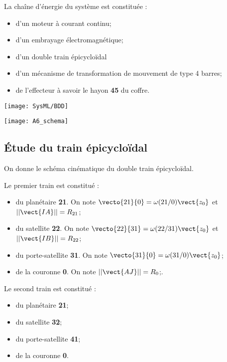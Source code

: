 \begin{multicols}{2}


La chaîne d'énergie du système est constituée :
\begin{itemize}
\item d'un moteur à courant continu;
\item d'un embrayage électromagnétique;
\item d'un double train épicycloïdal
\item d'un mécanisme de transformation de mouvement de type 4 barres;
\item de l'effecteur à savoir le hayon \textbf{45} du coffre.
\end{itemize}

\begin{center}
\texttt{[image: SysML/BDD]}
\end{center}


\begin{center}
\texttt{[image: A6\_schema]}
\end{center}

\fi

\subsection*{Étude du train épicycloïdal}
\ifprof
\else

On donne le schéma cinématique du double train épicycloïdal. 


Le premier train est constitué :
\begin{itemize}
\item du planétaire \textbf{21}. On note $\vecto{21}{0}=\omega(21/0)\vect{z_0}$ et $||\vect{IA}|| =R_{21} $;
\item du satellite \textbf{22}. On note $\vecto{22}{31}=\omega(22/31)\vect{z_0}$ et $||\vect{IB}|| =R_{22}$;
\item du porte-satellite \textbf{31}. On note $\vecto{31}{0}=\omega(31/0)\vect{z_0}$;
\item de la couronne \textbf{0}. On note  $||\vect{AJ}|| =R_{0}$;.
\end{itemize}
Le second train est constitué :
\begin{itemize}
\item du planétaire \textbf{21};
\item du satellite \textbf{32};
\item du porte-satellite \textbf{41};
\item de la couronne \textbf{0}.
\end{itemize}



\end{multicols}
